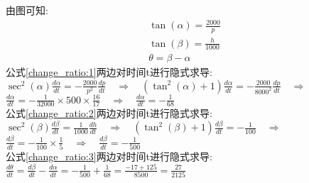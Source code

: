 由图可知:\\
\begin{gather}
\tan(\alpha)=\frac{2000}{p}\label{change_ratio:1}\\
\tan(\beta)=\frac{h}{1000}\label{change_ratio:2}\\
\theta=\beta-\alpha\label{change_ratio:3}
\end{gather}
公式\eqref{change_ratio:1}两边对时间t进行隐式求导:\\[1ex]
$\displaystyle\sec^2(\alpha)\frac{d\alpha}{dt}=-\frac{2000}{p^2}\frac{dp}{dt}\quad\Rightarrow\quad(\tan^2(\alpha)+1)\frac{d\alpha}{dt}=-\frac{2000}{8000^2}\frac{dp}{dt}\quad\Rightarrow$\\[1ex]
$\displaystyle\frac{d\alpha}{dt}=-\frac{1}{32000}\times 500\times\frac{16}{17}\quad\Rightarrow\quad\frac{d\alpha}{dt}=-\frac{1}{68}$\\[1ex]
公式\eqref{change_ratio:2}两边对时间t进行隐式求导:\\[1ex]
$\displaystyle\sec^2(\beta)\frac{d\beta}{dt}=\frac{1}{1000}\frac{dh}{dt}\quad\Rightarrow\quad(\tan^2(\beta)+1)\frac{d\beta}{dt}=-\frac{1}{100}\quad\Rightarrow$\\[1ex]
$\displaystyle\frac{d\beta}{dt}=-\frac{1}{100}\times\frac{1}{5}\quad\Rightarrow\quad\frac{d\beta}{dt}=-\frac{1}{500}$\\[1ex]
公式\eqref{change_ratio:3}两边对时间t进行隐式求导:\\[1ex]
$\displaystyle\frac{d\theta}{dt}=\frac{d\beta}{dt}-\frac{d\alpha}{dt}=-\frac{1}{500}+\frac{1}{68}=\frac{-17+125}{8500}=\frac{27}{2125}$\\[1ex]
